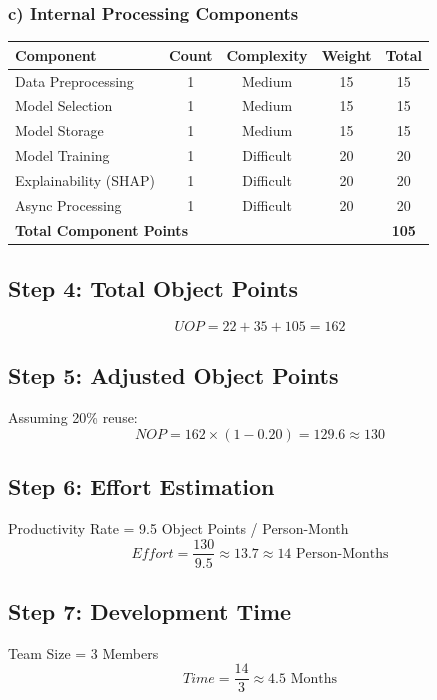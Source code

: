 \subsubsection*{c) Internal Processing Components}
\begin{table}[H]
    \centering
    \begin{tabular}{|l|c|c|c|c|}
    \hline
    \textbf{Component} & \textbf{Count} & \textbf{Complexity} & \textbf{Weight} & \textbf{Total} \\ \hline
    Data Preprocessing & 1 & Medium & 15 & 15 \\ \hline
    Model Selection & 1 & Medium & 15 & 15 \\ \hline
    Model Storage & 1 & Medium & 15 & 15 \\ \hline
    Model Training & 1 & Difficult & 20 & 20 \\ \hline
    Explainability (SHAP) & 1 & Difficult & 20 & 20 \\ \hline
    Async Processing & 1 & Difficult & 20 & 20 \\ \hline
    \multicolumn{4}{|l|}{\textbf{Total Component Points}} & \textbf{105} \\ \hline
    \end{tabular}
\end{table}

\subsection*{Step 4: Total Object Points}
\[ UOP = 22 + 35 + 105 = 162 \]

\subsection*{Step 5: Adjusted Object Points}
Assuming 20\% reuse:
\[ NOP = 162 \times (1 - 0.20) = 129.6 \approx 130 \]

\subsection*{Step 6: Effort Estimation}
Productivity Rate = 9.5 Object Points / Person-Month
\[ Effort = \frac{130}{9.5} \approx 13.7 \approx 14 \text{ Person-Months} \]

\subsection*{Step 7: Development Time}
Team Size = 3 Members
\[ Time = \frac{14}{3} \approx 4.5 \text{ Months} \]

